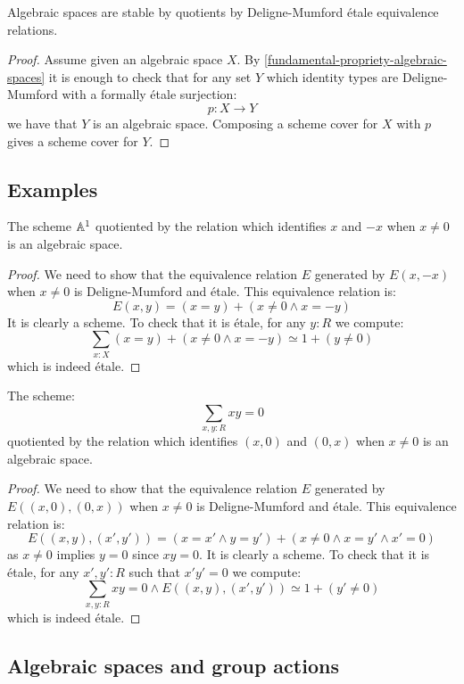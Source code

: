 \begin{lemma}
Algebraic spaces are stable by quotients by Deligne-Mumford étale equivalence relations.
\end{lemma}

\begin{proof}
Assume given an algebraic space $X$. By \cref{fundamental-propriety-algebraic-spaces} it is enough to check that for any set $Y$ which identity types are Deligne-Mumford with a formally étale surjection:
\[p:X\to Y\]
we have that $Y$ is an algebraic space. Composing a scheme cover for $X$ with $p$ gives a scheme cover for $Y$.
\end{proof}

\subsection{Examples}

\begin{example}
The scheme $\mathbb{A}^1$ quotiented by the relation which identifies $x$ and $-x$ when $x\not=0$ is an algebraic space.
\end{example}

\begin{proof}
We need to show that the equivalence relation $E$ generated by $E(x,-x)$ when $x\not=0$ is Deligne-Mumford and étale. This equivalence relation is:
\[E(x,y) = (x=y) + (x\not=0 \land x=-y)\]
It is clearly a scheme. To check that it is étale, for any $y:R$ we compute:
\[\sum_{x:X}(x=y) + (x\not=0 \land x=-y) \simeq 1 + (y\not=0)\]
which is indeed étale.
\end{proof}

\begin{example}
The scheme:
\[\sum_{x,y:R} xy=0\]
quotiented by the relation which identifies $(x,0)$ and $(0,x)$ when $x\not=0$ is an algebraic space.
\end{example}

\begin{proof}
We need to show that the equivalence relation $E$ generated by $E((x,0),(0,x))$ when $x\not=0$ is Deligne-Mumford and étale. This equivalence relation is:
\[E((x,y),(x',y')) = (x=x'\land y=y') + (x\not=0 \land x=y' \land x'=0)\]
as $x\not=0$ implies $y=0$ since $xy=0$. It is clearly a scheme. To check that it is étale, for any $x',y':R$ such that $x'y'=0$ we compute:
\[\sum_{x,y:R} xy=0 \land E((x,y),(x',y')) \simeq 1+ (y'\not=0)\]
which is indeed étale.
\end{proof}

\subsection{Algebraic spaces and group actions}

